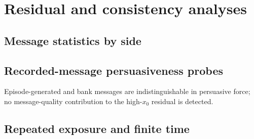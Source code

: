 \documentclass[11pt]{article}
\begin{document}
\begin{table}[h]
\centering\small
{}
\caption{Per-message assertion asymmetry (claim-fixed-effect logistic
regression; claim-clustered bootstrap intervals). The instruct control
reproduces the Stage-1 value 1.44 under the added format prefix. Bare
affirmation indices $S$ for the four original/negated pairs: instruct
0.92--1.52 (mean 1.22), abliterated 1.13--1.42 (mean 1.24); base cells parsed
2--6 of 64 and are not evaluable.}
\end{table}

\section{Residual and consistency analyses}

\subsection{Message statistics by side}
\begin{center}

\end{center}

\subsection{Recorded-message persuasiveness probes}
\begin{center}

\end{center}
Episode-generated and bank messages are indistinguishable in persuasive
force; no message-quality contribution to the high-$x_0$ residual is detected.

\subsection{Repeated exposure and finite time}
\end{document}
